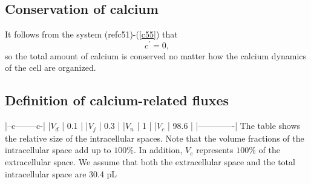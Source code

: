 \subsection{Conservation of calcium}

It follows from the system (ref{c51})-(\ref{c55}) that
\begin{equation}
c^{\prime}=0,
\end{equation}
so the total amount of calcium is conserved no matter how the calcium
dynamics of the cell are organized.



\subsection{Definition of calcium-related fluxes}


|--c--------c-|
|$V_d$ | 0.1  |
|$V_j$ | 0.3  |
|$V_n$ | 1    |
|$V_c$ | 98.6 |
|-------------|
The table shows the relative size of the intracellular spaces. Note that the volume fractions
of the intracellular space add up to $100\%$. In addition, $V_e$ represents $100\%$ of the extracellular space.
We assume that both the extracellular space and the total intracellular space are 30.4 pL


